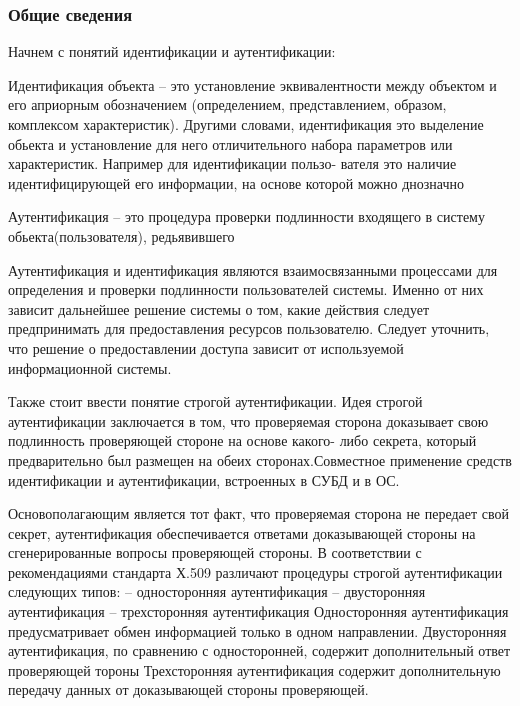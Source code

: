 \subsubsection{Общие сведения}
Начнем с понятий идентификации и аутентификации:

Идентификация объекта – это установление эквивалентности между объектом и его априорным обозначением (определением, представлением, образом, комплексом характеристик). Другими словами, идентификация это выделение обьекта и установление для него отличительного набора параметров или характеристик. Например для идентификации пользо- вателя это наличие идентифицирующей его информации, на основе которой можно днозначно %

Аутентификация – это процедура проверки подлинности входящего в систему обьекта(пользователя), редьявившего %

Аутентификация и идентификация являются взаимосвязанными процессами для определения и проверки подлинности пользователей системы. Именно от них зависит дальнейшее решение системы о том, какие действия следует предпринимать для предоставления ресурсов пользователю. Следует уточнить, что решение о предоставлении доступа зависит от используемой информационной системы.

Также стоит ввести понятие строгой аутентификации. Идея строгой аутентификации заключается в том, что проверяемая сторона доказывает свою подлинность проверяющей стороне на основе какого- либо секрета, который предварительно был размещен на обеих сторонах.Совместное применение средств идентификации и аутентификации,
встроенных в СУБД и в ОС.

Основополагающим является тот факт, что проверяемая сторона не передает свой секрет, аутентификация обеспечивается ответами доказывающей стороны на сгенерированные вопросы проверяющей стороны.
В соответствии с рекомендациями стандарта Х.509 различают процедуры строгой аутентификации следующих типов:
– односторонняя аутентификация – двусторонняя аутентификация – трехсторонняя аутентификация
Односторонняя аутентификация предусматривает обмен информацией только в одном направлении.
Двусторонняя аутентификация, по сравнению с односторонней, содержит дополнительный ответ проверяющей тороны %
Трехсторонняя аутентификация содержит дополнительную передачу данных от доказывающей стороны проверяющей.

